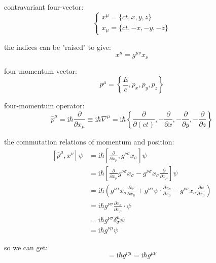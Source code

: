 contravariant four-vector:
\begin{equation}
\begin{cases}
x^\mu = \{ct, x, y, z\} \\
x_\mu = \{ct, -x, -y, -z\}
\end{cases}
\end{equation}

the indices can be "raised" to give:
\begin{equation}
x^\mu = g^{\mu\nu} x_\nu
\end{equation}

four-momentum vector:
\begin{equation}
p^\mu = \left\{\frac{E}{c}, p_x, p_y, p_z\right\}
\end{equation}

four-momentum operator:
\begin{equation}
\hat{p}^\mu = \mathrm{i}\hbar \frac{\partial}{\partial x_\mu} \equiv \mathrm{i}\hbar \nabla^\mu = \mathrm{i}\hbar \left\{\frac{\partial}{\partial(ct)}, -\frac{\partial}{\partial x}, -\frac{\partial}{\partial y}, -\frac{\partial}{\partial z}\right\}
\end{equation}

the commutation relations of momentum and position:
\begin{equation}
\begin{aligned}
[\hat{p}^\mu, x^\nu] \psi &= \mathrm{i}\hbar \left[ \frac{\partial}{\partial x_\mu}, g^{\nu\sigma} x_\sigma \right] \psi \\
&= \mathrm{i}\hbar \left[ \frac{\partial}{\partial x_\mu} g^{\nu\sigma} x_\sigma - g^{\nu\sigma} x_\sigma \frac{\partial}{\partial x_\mu} \right] \psi \\
&= \mathrm{i}\hbar \left( g^{\nu\sigma} x_\sigma \frac{\partial\psi}{\partial x_\mu} + g^{\nu\sigma} \psi \cdot \frac{\partial x_\sigma}{\partial x_\mu} - g^{\nu\sigma} x_\sigma \frac{\partial\psi}{\partial x_\mu} \right) \\
&= \mathrm{i}\hbar g^{\nu\sigma} \frac{\partial x_\sigma}{\partial x_\mu} \cdot \psi \\
&= \mathrm{i}\hbar g^{\nu\sigma} \delta^\mu_\sigma \psi \\
&= \mathrm{i}\hbar g^{\nu\mu} \psi
\end{aligned}
\end{equation}

so we can get:
\begin{equation}
[\hat{p}^\mu, x^\nu] = \mathrm{i}\hbar g^{\nu\mu} = \mathrm{i}\hbar g^{\mu\nu}
\end{equation}

